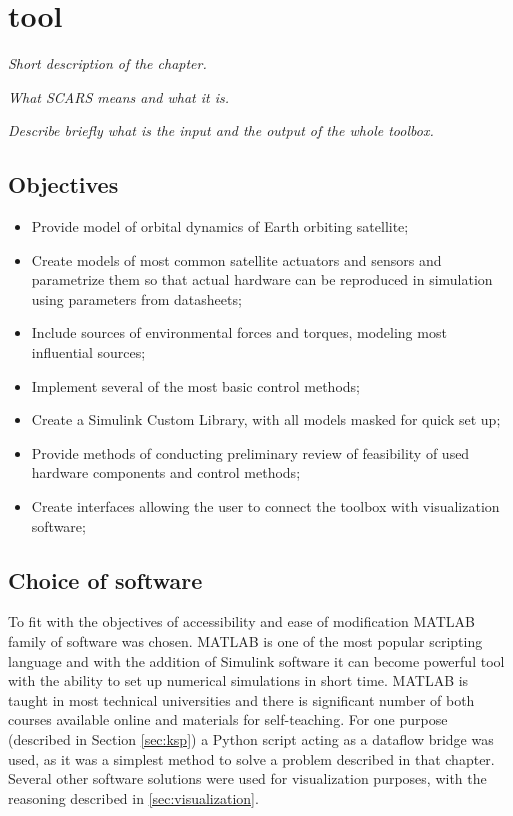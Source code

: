 \section{\acf{tool}}\label{sec:toolbox}
\textit{Short description of the chapter.}

\textit{What SCARS means and what it is.}

\textit{Describe briefly what is the input and the output of the whole toolbox.}

\subsection{Objectives}\label{toolbox:objectives}

    \begin{itemize}
        \item Provide model of orbital dynamics of Earth orbiting satellite;
        \item Create models of most common satellite actuators and sensors and parametrize them so that actual hardware can be reproduced in simulation using parameters from datasheets;
        \item Include sources of environmental forces and torques, modeling most influential sources;
        \item Implement several of the most basic control methods;
        \item Create a Simulink Custom Library, with all models masked for quick set up;
        \item Provide methods of conducting preliminary review of feasibility of used hardware components and control methods;
        \item Create interfaces allowing the user to connect the toolbox with visualization software;
    \end{itemize}

\subsection{Choice of software}
    To fit with the objectives of accessibility and ease of modification MATLAB family of software was chosen. MATLAB is one of the most popular scripting language and with the addition of Simulink software it can become powerful tool with the ability to set up numerical simulations in short time. MATLAB is taught in most technical universities and there is significant number of both courses available online and materials for self-teaching. For one purpose (described in Section \ref{sec:ksp}) a Python script acting as a dataflow bridge was used, as it was a simplest method to solve a problem described in that chapter. Several other software solutions were used for visualization purposes, with the reasoning described in \autoref{sec:visualization}.

